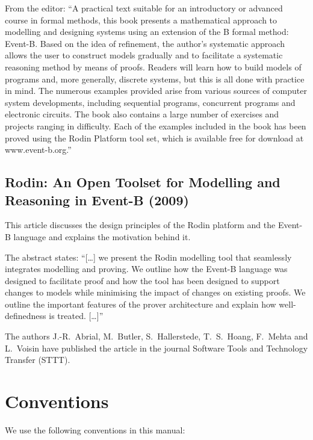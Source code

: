 \documentclass[12pt]{book}
\begin{document}
From the editor: ``A practical text suitable for an introductory or advanced course in formal methods, this book presents a mathematical approach to modelling and designing systems using an extension of the B formal method: Event-B. Based on the idea of refinement, the author's systematic approach allows the user to construct models gradually and to facilitate a systematic reasoning method by means of proofs. Readers will learn how to build models of programs and, more generally, discrete systems, but this is all done with practice in mind. The numerous examples provided arise from various sources of computer system developments, including sequential programs, concurrent programs and electronic circuits. The book also contains a large number of exercises and projects ranging in difficulty. Each of the examples included in the book has been proved using the Rodin Platform tool set, which is available free for download at www.event-b.org.''

\subsection{Rodin: An Open Toolset for Modelling and Reasoning in Event-B (2009)}
\label{abrialBHHMV_2009}

This article discusses the design principles of the Rodin platform and the Event-B language and 
explains the motivation behind it.

The abstract states: ``[\ldots] we present the Rodin modelling tool that seamlessly integrates modelling and proving. 
 We outline how the Event-B language was designed to facilitate proof and how the tool has been designed to support changes to 
 models while minimising the impact of changes on existing proofs. 
 We outline the important features of the prover architecture and explain how well-definedness is treated. [\ldots]''

The authors J.-R.~Abrial, M.~Butler, S.~Hallerstede, T.~S.~Hoang, F.~Mehta and L.~Voisin have published the article in the journal Software Tools and Technology Transfer (STTT).

\section{Conventions}
\label{conventions}

We use the following conventions in this manual:

\end{document}
